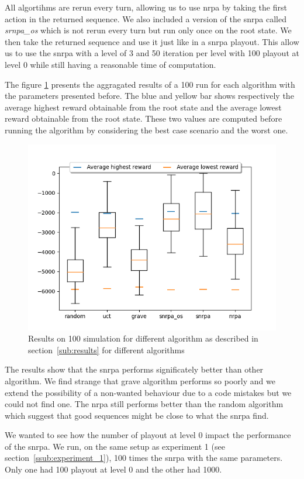 All algortihms are rerun every turn, allowing us to use \gls{nrpa} by taking the first action in the returned sequence.
We also included a version of the \gls{snrpa} called \textit{srnpa\_os} which is not rerun every turn but run only once on the root state.
We then take the returned sequence and use it just like in a \gls{snrpa} playout.
This allow us to use the \gls{snrpa} with a level of 3 and 50 iteration per level with 100 playout at level 0 while still having a reasonable time of computation.

The figure \ref{fig:results} presents the aggragated results of a 100 run for each algorithm with the parameters presented before.
The blue and yellow bar shows respectively the average highest reward obtainable from the root state and the average lowest reward obtainable from the root state.
These two values are computed before running the algorithm by considering the best case scenario and the worst one.

\begin{figure}[htpb]
    \centering
    \includegraphics[width=0.8\linewidth]{./src/figures/moustache.png}
    \caption{Results on 100 simulation for different algorithm as described in section~\ref{sub:results} for different algorithms}
    \label{fig:results}
\end{figure}

The results show that the \gls{snrpa} performs significately better than other algorithm. 
We find strange that \gls{grave} algorithm performs so poorly and we extend the possibility of a non-wanted behaviour due to a code mistakes but we could not find one.
The \gls{nrpa} still performs better than the random algorithm which suggest that good sequences might be close to what the \gls{snrpa} find.

We wanted to see how the number of playout at level 0 impact the performance of the \gls{snrpa}.
We run, on the same setup as experiment 1 (see section~\ref{ssub:experiment_1}), 100 times the \gls{snrpa} with the same parameters.
Only one had 100 playout at level 0 and the other had 1000.

